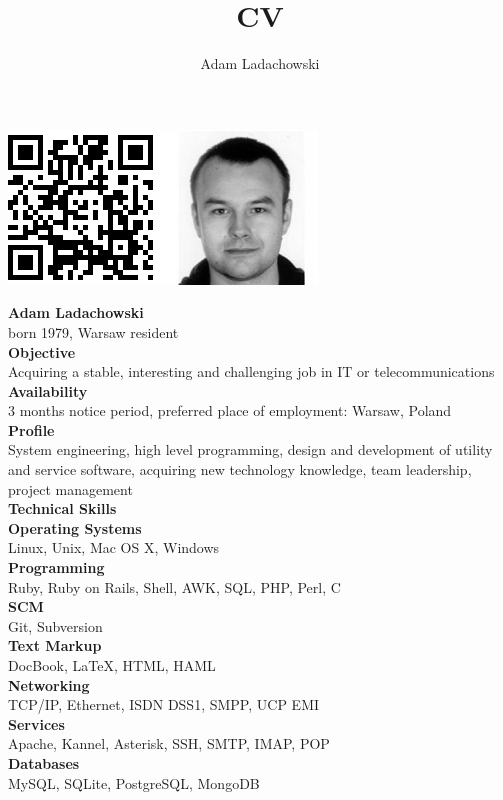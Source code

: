 \documentclass[9pt,a4paper,twocolumn]{extarticle}
\title{CV}
\author{Adam Ladachowski}
\begin{document}
\includegraphics[width=\columnwidth]{photo_qr.png}
\vspace{0.2cm}

{\bf\Huge Adam Ladachowski}\\
born 1979, Warsaw resident\\

{\bf\Large Objective}\\

Acquiring a stable, interesting and challenging job in IT or telecommunications\\

{\bf\Large Availability}\\

3 months notice period, preferred place of employment: Warsaw, Poland\\

{\bf\Large Profile}\\

System engineering, high level programming, design and development of utility and service software, acquiring new technology knowledge, team leadership, project management\\

{\bf\Large Technical Skills}\\

{\bf Operating Systems}\\
Linux, Unix, Mac OS X, Windows\\
{\bf Programming}\\
Ruby, Ruby on Rails, Shell, AWK, SQL, PHP, Perl, C\\
{\bf SCM}\\
Git, Subversion\\
{\bf Text Markup}\\
DocBook, \LaTeX, HTML, HAML\\
{\bf Networking}\\
TCP/IP, Ethernet, ISDN DSS1, SMPP, UCP EMI\\
{\bf Services}\\
Apache, Kannel, Asterisk, SSH, SMTP, IMAP, POP\\
{\bf Databases}\\
MySQL, SQLite, PostgreSQL, MongoDB\\
\end{document}

